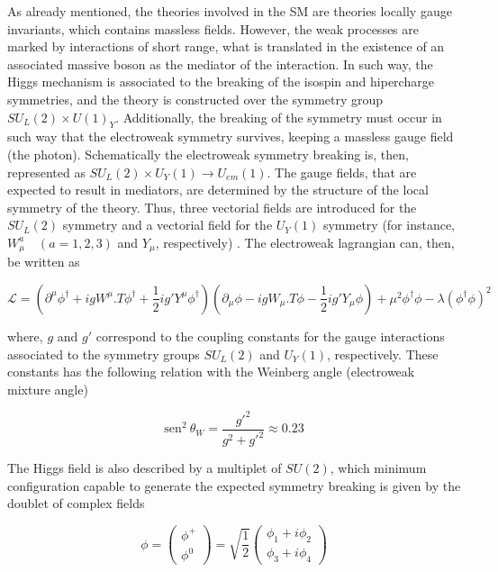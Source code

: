As already mentioned, the theories involved in the SM are theories locally gauge invariants, which contains massless fields. However, the weak processes are marked by interactions of short range, what is translated in the existence of an associated massive boson as the mediator of the interaction. In such way, the Higgs mechanism is associated to the breaking of the isospin and hipercharge symmetries, and the theory is constructed over the symmetry group $SU_L(2) \times U(1)_Y$. Additionally, the breaking of the symmetry must occur in such way that the electroweak symmetry survives, keeping a massless gauge field (the photon). Schematically the electroweak symmetry breaking is, then, represented as $SU_L(2) \times U_Y(1) \rightarrow U_{em}(1)$. The gauge fields, that are expected to result in mediators, are determined by the structure of the local symmetry of the theory. Thus, three vectorial fields are introduced for the $SU_L(2)$ symmetry and a vectorial field for the $U_Y(1)$ symmetry (for instance, $W_{\mu}^a \quad (a=1,2,3)$ and $Y_{\mu}$, respectively) \cite{bib:ellis-2003}. The electroweak lagrangian can, then, be written as

\begin{equation}
\mathcal{L} = \left( \partial^{\mu}\phi^{\dagger} + ig W^{\mu}.T\phi^{\dagger} + \dfrac{1}{2}ig' Y^{\mu}\phi^{\dagger} \right) \left( \partial_{\mu}\phi - ig W_{\mu}.T\phi - \dfrac{1}{2}ig' Y_{\mu}\phi \right) + \mu^{2}\phi^{\dagger}\phi - \lambda(\phi^{\dagger}\phi)^{2}
\end{equation}

where, $g$ and $g'$ correspond to the coupling constants for the gauge interactions associated to the symmetry groups $SU_L(2)$ and $U_Y(1)$, respectively. These constants has the following relation with the Weinberg angle (electroweak mixture angle)

\begin{equation}
\textrm{sen}^{2}~\theta_W = \dfrac{g'^{2}}{g^{2}+g'^{2}} \approx 0.23
\end{equation}

The Higgs field is also described by a multiplet of $SU(2)$, which minimum configuration capable to generate the expected symmetry breaking is given by the doublet of complex fields

\begin{equation}
\phi = \left(\begin{aligned} \phi^{+} \\ \phi^{0} \end{aligned} \right) = \sqrt{\dfrac{1}{2}} \left(\begin{aligned} \phi_1 + i\phi_2 \\ \phi_3 + i\phi_4 \end{aligned} \right)
\label{eq:Higgs_dubleto}
\end{equation}

